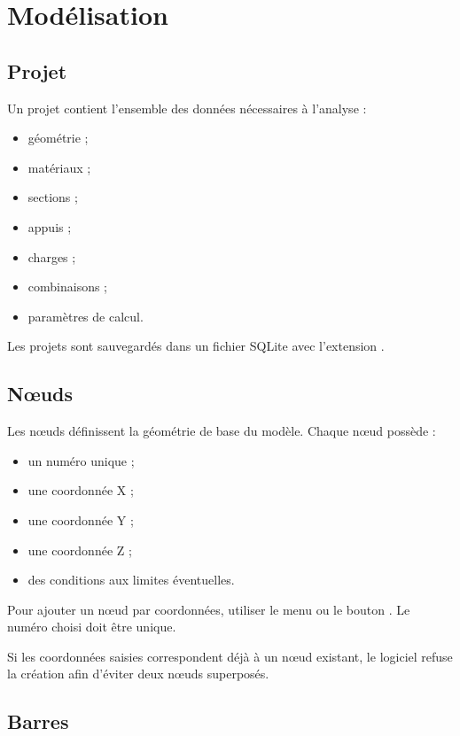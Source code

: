 \chapter{Modélisation}

\section{Projet}

Un projet contient l'ensemble des données nécessaires à l'analyse :

\begin{itemize}
  \item géométrie ;
  \item matériaux ;
  \item sections ;
  \item appuis ;
  \item charges ;
  \item combinaisons ;
  \item paramètres de calcul.
\end{itemize}

Les projets sont sauvegardés dans un fichier SQLite avec l'extension
.

\section{Nœuds}

Les nœuds définissent la géométrie de base du modèle. Chaque nœud possède :

\begin{itemize}
  \item un numéro unique ;
  \item une coordonnée X ;
  \item une coordonnée Y ;
  \item une coordonnée Z ;
  \item des conditions aux limites éventuelles.
\end{itemize}

Pour ajouter un nœud par coordonnées, utiliser le menu ou le bouton
. Le numéro choisi doit être unique.

\begin{infobox}
Si les coordonnées saisies correspondent déjà à un nœud existant, le logiciel
refuse la création afin d'éviter deux nœuds superposés.
\end{infobox}

\section{Barres}

